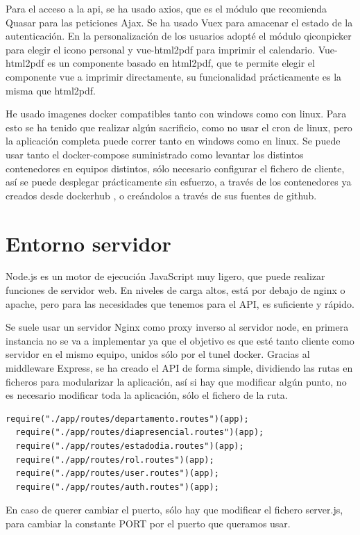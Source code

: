 \documentclass[11pt,spanish,listoffigures,listoftables]{tfgetsinf}
\begin{document}
Para el acceso a la api, se ha usado axios, que es el módulo que recomienda Quasar para las peticiones Ajax. Se ha usado Vuex para amacenar el estado de la autenticación.
En la personalización de los usuarios adopté el módulo qiconpicker para elegir el icono personal y vue-html2pdf para imprimir el calendario. Vue-html2pdf es un componente basado en html2pdf, que te permite elegir el componente vue a imprimir directamente, su funcionalidad prácticamente es la misma que html2pdf.

He usado imagenes docker compatibles tanto con windows como con linux. Para esto se ha tenido que realizar algún sacrificio, como no usar el cron de linux, pero la aplicación completa puede correr tanto en windows como en linux.
Se puede usar tanto el docker-compose suministrado como levantar los distintos contenedores en equipos distintos, sólo necesario configurar el fichero de cliente, así se puede desplegar prácticamente sin esfuerzo, a través de los contenedores ya creados desde dockerhub , o creándolos a través de sus fuentes de github. 

\section{Entorno servidor}
Node.js es un motor de ejecución JavaScript muy ligero, que puede realizar funciones de servidor web. 
En niveles de carga altos, está por debajo de nginx o apache, pero para las necesidades que tenemos para el API, es suficiente y rápido.

Se suele usar un servidor Nginx como proxy inverso al servidor node, en primera instancia no se va a implementar ya que el objetivo es que esté tanto cliente como servidor en el mismo equipo, unidos sólo por el tunel docker.
Gracias al middleware Express, se ha creado el API de forma simple, dividiendo las rutas en ficheros para modularizar la aplicación, así si hay que modificar algún punto, no es necesario modificar toda la aplicación, sólo el fichero de la ruta.

\begin{lstlisting}[style=ES6, caption={ES6 (ECMAScript-2015) Listing}]
  require("./app/routes/departamento.routes")(app);
  require("./app/routes/diapresencial.routes")(app);
  require("./app/routes/estadodia.routes")(app);
  require("./app/routes/rol.routes")(app);
  require("./app/routes/user.routes")(app);
  require("./app/routes/auth.routes")(app);
  \end{lstlisting}

  En caso de querer cambiar el puerto, sólo hay que modificar el fichero server.js, para cambiar la constante PORT por el puerto que queramos usar. 
\end{document}
